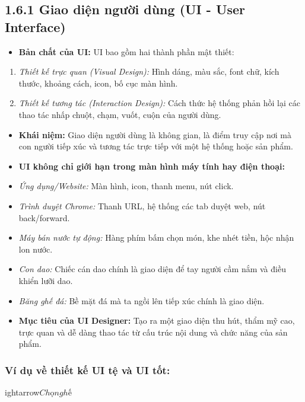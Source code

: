 \documentclass[11pt,a4paper,oneside]{report}
\begin{document}
\subsection{1.6.1 Giao diện người dùng (UI - User Interface)}
\begin{itemize}[leftmargin=1.5em]
\item \textbf{Bản chất của UI:} UI bao gồm hai thành phần mật thiết:
\end{itemize}
\begin{enumerate}[leftmargin=1.5em]
\item \textit{Thiết kế trực quan (Visual Design):} Hình dáng, màu sắc, font chữ, kích thước, khoảng cách, icon, bố cục màn hình.
\item \textit{Thiết kế tương tác (Interaction Design):} Cách thức hệ thống phản hồi lại các thao tác nhấp chuột, chạm, vuốt, cuộn của người dùng.
\end{enumerate}
\begin{itemize}[leftmargin=1.5em]
\item \textbf{Khái niệm:} Giao diện người dùng là không gian, là điểm truy cập nơi mà con người tiếp xúc và tương tác trực tiếp với một hệ thống hoặc sản phẩm.
\item \textbf{UI không chỉ giới hạn trong màn hình máy tính hay điện thoại:}
\item \textit{Ứng dụng/Website:} Màn hình, icon, thanh menu, nút click.
\item \textit{Trình duyệt Chrome:} Thanh URL, hệ thống các tab duyệt web, nút back/forward.
\item \textit{Máy bán nước tự động:} Hàng phím bấm chọn món, khe nhét tiền, hộc nhận lon nước.
\item \textit{Con dao:} Chiếc cán dao chính là giao diện để tay người cầm nắm và điều khiển lưỡi dao.
\item \textit{Băng ghế đá:} Bề mặt đá mà ta ngồi lên tiếp xúc chính là giao diện.
\item \textbf{Mục tiêu của UI Designer:} Tạo ra một giao diện thu hút, thẩm mỹ cao, trực quan và dễ dàng thao tác từ cấu trúc nội dung và chức năng của sản phẩm.
\end{itemize}

\subsubsection{Ví dụ về thiết kế UI tệ và UI tốt:}
ightarrow$ Chọn ghế $
\end{document}
